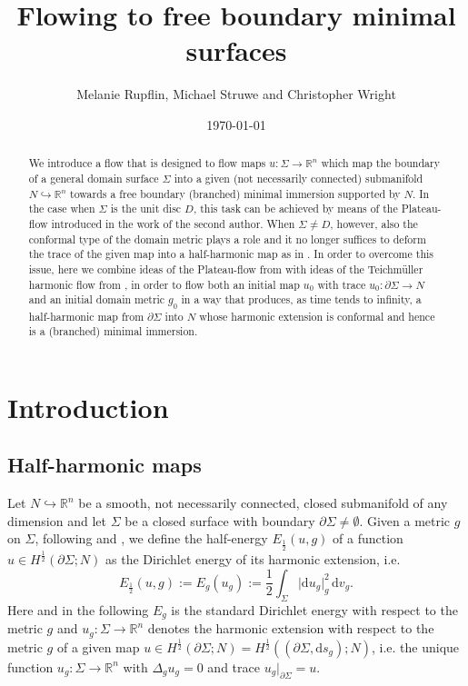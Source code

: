 \documentclass[10pt,reqno]{amsart}
\title{\sc Flowing to free boundary minimal surfaces}
\author{Melanie Rupflin, Michael Struwe and Christopher Wright}
\date{\today}
\theoremstyle{plain}
\theoremstyle{definition}
\numberwithin{equation}{section}
\newcommand{\Si}{\Sigma}
\newcommand{\De}{\Delta}
\newcommand{\R}{\ensuremath{{\mathbb R}}}
\newcommand{\beq}{\begin{equation}}
\newcommand{\eeq}{\end{equation}}
\newcommand{\half}{\frac{1}{2}}
\newcommand{\dd}{\mathrm{d}} %
\newcommand{\abs}[1]{\vert#1\vert}
\newcommand{\pSi}{{\partial \Sigma}}
\begin{document}
\maketitle
\begin{abstract}
We introduce a flow that is designed to flow maps $u:\Si\to \R^n$ which map the boundary of a general domain surface $\Si$ into a given (not necessarily connected) submanifold $N\hookrightarrow \R^n$ towards a free boundary (branched) minimal immersion supported by $N$. In the case when $\Si$ is the unit disc $D$, this task can be achieved by means of the Plateau-flow introduced in the work \cite{S} of the second author. When $\Si\neq D$, however, also the conformal type of the domain metric plays a role and it no longer suffices to deform the trace of the given map into a half-harmonic map as in \cite{S}. In order to overcome this issue, here we combine ideas of the Plateau-flow from \cite{S} with ideas of the Teichm\"uller harmonic flow from \cite{Rupflin-Topping}, in order to flow both an initial map $u_0$ with trace $u_0\colon\pSi\to N$ and an initial domain metric $g_0$ in a way that produces, as time tends to infinity, a half-harmonic map from $\pSi$ into $N$ whose harmonic extension is conformal and hence is a (branched) minimal immersion.  
\end{abstract} 


\section{Introduction}
\subsection{Half-harmonic maps}
Let $N\hookrightarrow \R^n$ be a smooth, not necessarily connected,  closed submanifold of any dimension and let  $\Si$ be a closed surface with boundary $\partial \Si\neq \emptyset$. Given a metric $g$ on $\Si$, following \cite{DaLio-Riviere} and \cite{DaLio-Pigati}, we define the half-energy $E_{\half}(u,g)$ of a function $u\in H^\half(\partial \Si; N)$ as the Dirichlet energy of its harmonic extension, i.e.
\beq\label{def:half-energy}
    E_{\half}(u,g):= E_g(u_g):=\half\int_{\Si}\abs{\dd u_g}_g^2\,\dd v_g.
\eeq
Here and in the following  $E_g$ is the standard Dirichlet energy with respect to the metric $g$ and $u_g\colon\Si\to\R^n$ denotes the harmonic extension with respect to the metric $g$ of a given map $u\in H^\half(\pSi; N)=H^\half((\partial \Si, \dd s_g);N)$, i.e. the unique function $u_g:\Si\to \R^n$ with $\De_g u_g=0$ and trace $u_g\vert_{\pSi}=u$.
\end{document}
